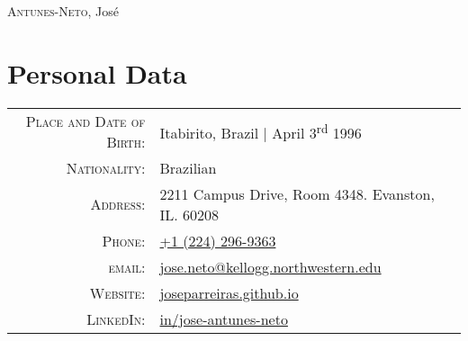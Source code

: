 \documentclass[a4paper,10pt]{article}
\begin{document}
\par{
    \centering
		{\Huge \textsc{Antunes-Neto}, José
	}\bigskip\par
}

\section{Personal Data}

\begin{tabular}{rp{9.75cm}}
    \textsc{Place and Date of Birth:} & Itabirito, Brazil  | April 3\textsuperscript{rd}  1996 \\
    \textsc{Nationality:} & Brazilian\\
    \textsc{Address:}   & 2211 Campus Drive, Room 4348. Evanston, IL. 60208\\
    \textsc{Phone:}     & \href{tel:+12242969363}{+1 (224) 296-9363}\\
    \textsc{email:}     & \href{mailto:jose.neto@kellogg.northwestern.edu}{jose.neto@kellogg.northwestern.edu} \\
    \textsc{Website:}   & \href{http://joseparreiras.github.io}{joseparreiras.github.io} \\
    \textsc{LinkedIn:}  & \href{https://www.linkedin.com/in/jose-antunes-neto/}{in/jose-antunes-neto}
\end{tabular}

\end{document}
